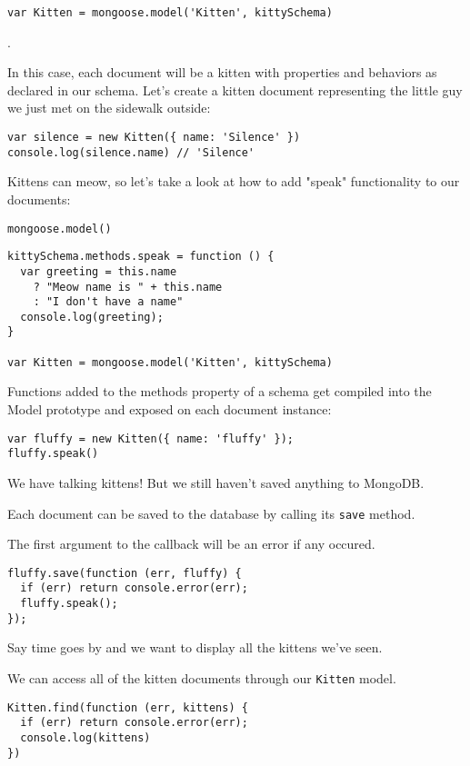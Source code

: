 \begin{verbatim}
var Kitten = mongoose.model('Kitten', kittySchema)
\end{verbatim}
. 

In this case, each document will be a kitten with properties and behaviors as declared in our schema. 
Let's create a kitten document representing the little guy we just met on the sidewalk outside:
\begin{verbatim}
var silence = new Kitten({ name: 'Silence' })
console.log(silence.name) // 'Silence'
\end{verbatim}

Kittens can meow, so let's take a look at how to add "speak" functionality to our documents:

 \verb|mongoose.model()|
\begin{verbatim}
kittySchema.methods.speak = function () {
  var greeting = this.name
    ? "Meow name is " + this.name
    : "I don't have a name"
  console.log(greeting);
}

var Kitten = mongoose.model('Kitten', kittySchema)
\end{verbatim}
Functions added to the methods property of a schema get compiled into
the Model prototype and exposed on each document instance:
\begin{verbatim}
var fluffy = new Kitten({ name: 'fluffy' });
fluffy.speak()
\end{verbatim}

We have talking kittens! But we still haven't saved anything to
MongoDB. 

Each document can be saved to the database by calling its
\verb|save| method. 

The first argument to the callback will be an error if
any occured.

\begin{verbatim}
fluffy.save(function (err, fluffy) {
  if (err) return console.error(err);
  fluffy.speak();
});
\end{verbatim}

Say time goes by and we want to display all the kittens we've seen. 

We can access all of the kitten documents through our \verb|Kitten| model.

\begin{verbatim}
Kitten.find(function (err, kittens) {
  if (err) return console.error(err);
  console.log(kittens)
})
\end{verbatim}

